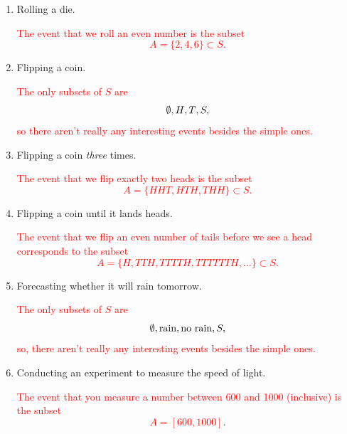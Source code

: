 \documentclass[12pt,reqno]{amsart}
\begin{document}
\medskip
\begin{enumerate}
\item Rolling a die.
    
\bigskip
\textcolor{red}{The event that we roll an even number is the subset
	\[
	A = \{2, 4, 6\} \subset S.
	\]}
\bigskip

\item Flipping a coin.
    
\bigskip
\textcolor{red}{The only subsets of $S$ are
	\[
	\emptyset, \\{H\\}, \\{T\\}, S,
	\]
so there aren't really any interesting events besides the simple ones.}
\bigskip

\item Flipping a coin \textit{three} times.
    
\bigskip
\textcolor{red}{The event that we flip exactly two heads is the subset
	\[
	A = \{HHT, HTH, THH\}\subset S.
	\]}
\bigskip

\item Flipping a coin until it lands heads.
    
\bigskip
\textcolor{red}{The event that we flip an even number of tails before we see a head corresponds to the subset
	\[
	A = \{ H, TTH, TTTTH, TTTTTTH, \ldots\} \subset S.
	\]}
\bigskip

\item Forecasting whether it will rain tomorrow.
    
\bigskip
\textcolor{red}{The only subsets of $S$ are
	\[
	\emptyset, \\{\text{rain}\\}, \\{\text{no rain}\\}, S,
	\]
so, there aren't really any interesting events besides the simple ones.}
\bigskip

\item Conducting an experiment to measure the speed of light.
    
\bigskip
\textcolor{red}{The event that you measure a number between 600 and 1000 (inclusive) is the subset
	\[
	A = [600, 1000].
	\]}
\end{enumerate}
\end{document}
